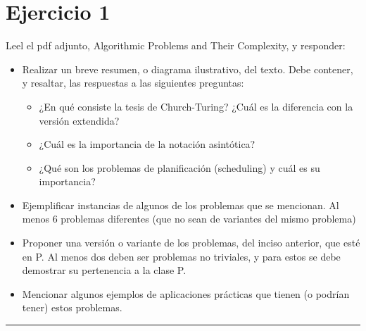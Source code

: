 \documentclass[12pt,letterpaper]{article}
\newcommand{\lineaxd}{{\color{brown}\rule{\linewidth}{0.5mm}}}
\begin{document}
\section*{Ejercicio 1}
Leel el pdf adjunto, Algorithmic Problems and Their Complexity, y responder:

\begin{itemize}
    \item Realizar un breve resumen, o diagrama ilustrativo, del texto. Debe contener, y resaltar, las respuestas a las siguientes preguntas:
    
\begin{itemize}
    \item ¿En qué consiste la tesis de Church-Turing? ¿Cuál es la diferencia con la versión extendida?
    
    \item ¿Cuál es la importancia de la notación asintótica?
    
    \item ¿Qué son los problemas de planificación (scheduling) y cuál es su importancia?
    
\end{itemize}
    
    \item Ejemplificar instancias de algunos de los problemas que se mencionan. Al menos 6 problemas diferentes (que no sean de variantes del mismo problema)
    
    \item Proponer una versión o variante de los problemas, del inciso anterior, que esté en P. Al menos dos deben ser problemas no triviales, y para estos se debe demostrar su pertenencia a la clase P.
    
    \item Mencionar algunos ejemplos de aplicaciones prácticas que tienen (o podrían tener) estos problemas.
\end{itemize}

\lineaxd
\end{document}
